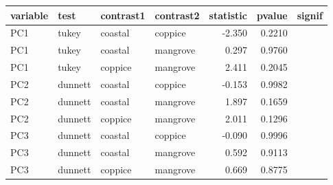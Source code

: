 
\begin{tabular}{llllrrl}
\toprule
variable & test & contrast1 & contrast2 & statistic & pvalue & signif\\
\midrule
PC1 & tukey & coastal & coppice & -2.350 & 0.2210 & \\
PC1 & tukey & coastal & mangrove & 0.297 & 0.9760 & \\
PC1 & tukey & coppice & mangrove & 2.411 & 0.2045 & \\
PC2 & dunnett & coastal & coppice & -0.153 & 0.9982 & \\
PC2 & dunnett & coastal & mangrove & 1.897 & 0.1659 & \\
\addlinespace
PC2 & dunnett & coppice & mangrove & 2.011 & 0.1296 & \\
PC3 & dunnett & coastal & coppice & -0.090 & 0.9996 & \\
PC3 & dunnett & coastal & mangrove & 0.592 & 0.9113 & \\
PC3 & dunnett & coppice & mangrove & 0.669 & 0.8775 & \\
\bottomrule
\end{tabular}
